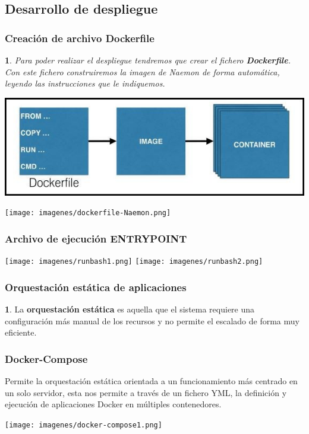 \documentclass{beamer}
\theoremstyle{plain}
\theoremstyle{definition}
\newtheorem{defn}[thm]{}
\theoremstyle{plain}
\newtheorem{prop}[thm]{}
\theoremstyle{definition}
\theoremstyle{remark}
\theoremstyle{definition}
\begin{document}
\subsection{Desarrollo de despliegue}
\begin{frame}
	\frametitle{Creación de archivo Dockerfile}
	\begin{prop}
		
		Para poder realizar el despliegue tendremos que crear el fichero \textbf{Dockerfile}. Con este fichero construiremos la imagen de Naemon de forma automática, leyendo las instrucciones que le indiquemos.
	\end{prop}
	\centering
	\includegraphics[scale=0.4]{imagenes/dockerfile-image.png}
	
\end{frame}


\begin{frame}
	\centering
	\texttt{[image: imagenes/dockerfile-Naemon.png]}
\end{frame}
\begin{frame}
		\frametitle{Archivo de ejecución ENTRYPOINT}
	\centering
	\texttt{[image: imagenes/runbash1.png]}
	\texttt{[image: imagenes/runbash2.png]}
\end{frame}

\begin{frame}
	\frametitle{Orquestación estática de aplicaciones}
	\begin{defn}
		La \textbf{orquestación estática} es aquella que el sistema requiere una configuración más
		manual de los recursos y no permite el escalado de forma muy eficiente.
	\end{defn}
\end{frame}
\begin{frame}
	\frametitle{Docker-Compose}
	Permite la orquestación estática orientada a un funcionamiento más centrado en un solo servidor, esta nos permite a través de un fichero YML,	la definición y ejecución de aplicaciones Docker en múltiples contenedores.
	
	\centering
	\texttt{[image: imagenes/docker-compose1.png]}
\end{frame}
\end{document}
